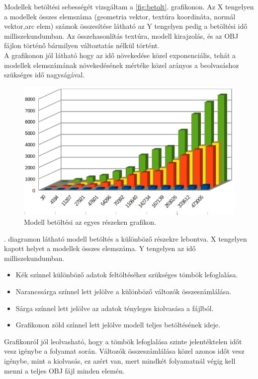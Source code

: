Modellek betöltési sebességét vizsgáltam a  \ref{fig:betolt}. grafikonon. Az X tengelyen a modellek összes elemszáma (geometria vektor, textúra koordináta, normál vektor,arc elem) számok összesítése látható az Y tengelyen pedig a betöltési idő milliszekundumban. Az összehasonlítás textúra, modell kirajzolás, és az OBJ fájlon történő bármilyen változtatás nélkül történt.\\

A grafikonon jól látható hogy az idő növekedése közel exponenciális, tehát a modellek elemszámának növekedésének mértéke közel  arányos a beolvasáshoz szükséges idő nagyságával.
\bigskip
{}
\begin{figure}[h]
\centering
\includegraphics[width=\textwidth]{images/betoltesiido2.png}
\caption{Modell betöltési az egyes részeken grafikon.}
\label{fig:betolt2}
\end{figure}
\bigskip
{}. diagramon látható modell betöltés a különböző részekre lebontva. X tengelyen kapott helyet a modellek összes elemszáma. Y tengelyen az idő milliszekundumban.
\begin{itemize}
\item Kék színnel különböző adatok feltöltéséhez szükséges tömbök lefoglalása.

\item Narancssárga színnel lett jelölve a különböző változók összeszámlálása.

\item Sárga színnel lett jelölve az adatok tényleges kiolvasása a fájlból.

\item Grafikonon zöld színnel lett jelölve modell teljes betöltésének ideje.
 \end{itemize}

Grafikonról  jól leolvasható, hogy a tömbök lefoglalása szinte jelentéktelen időt vesz igénybe a folyamat során. Változók összeszámlálása közel azonos időt vesz igénybe, mint a kiolvasás, ez azért van, mert mindkét folyamatnál végig kell menni a teljes OBJ fájl minden elemén. 